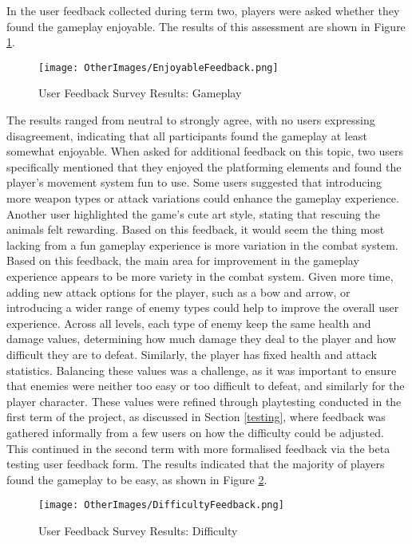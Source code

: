 \documentclass[10pt]{final_report}
\begin{document}
In the user feedback collected during term two, players were asked whether they found the gameplay enjoyable. The results of this assessment are shown in Figure \ref{fig:label_funfeedback}.
\begin{figure}[H]
    \centering
    \texttt{[image: OtherImages/EnjoyableFeedback.png]}
    \caption{User Feedback Survey Results: Gameplay}
    \label{fig:label_funfeedback}
\end{figure}
The results ranged from neutral to strongly agree, with no users expressing disagreement, indicating that all participants found the gameplay at least somewhat enjoyable. When asked for additional feedback on this topic, two users specifically mentioned that they enjoyed the platforming elements and found the player’s movement system fun to use. Some users suggested that introducing more weapon types or attack variations could enhance the gameplay experience. Another user highlighted the game’s cute art style, stating that rescuing the animals felt rewarding. Based on this feedback, it would seem the thing most lacking from a fun gameplay experience is more variation in the combat system. Based on this feedback, the main area for improvement in the gameplay experience appears to be more variety in the combat system. Given more time, adding new attack options for the player, such as a bow and arrow, or introducing a wider range of enemy types could help to improve the overall user experience. \newline
Across all levels, each type of enemy keep the same health and damage values, determining how much damage they deal to the player and how difficult they are to defeat. Similarly, the player has fixed health and attack statistics. Balancing these values was a challenge, as it was important to ensure that enemies were neither too easy or too difficult to defeat, and similarly for the player character. These values were refined through playtesting conducted in the first term of the project, as discussed in Section \ref{testing}, where feedback was gathered informally from a few users on how the difficulty could be adjusted. This continued in the second term with more formalised feedback via the beta testing user feedback form. The results indicated that the majority of players found the gameplay to be easy, as shown in Figure \ref{fig:label_difficultyfeedback}.

\begin{figure}[H]
    \centering
    \texttt{[image: OtherImages/DifficultyFeedback.png]}
    \caption{User Feedback Survey Results: Difficulty}
    \label{fig:label_difficultyfeedback}
\end{figure}
\end{document}
